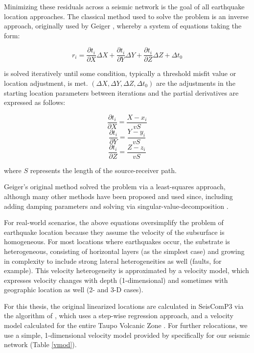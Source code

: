 Minimizing these residuals across a seismic network is the goal of all earthquake location approaches. The classical method used to solve the problem is an inverse approach, originally used by Geiger \citep{l1910,geiger1912probability}, whereby a system of equations taking the form:

\begin{equation}
r_i = \frac{\partial{t_i}}{\partial{X}}\Delta{X} + \frac{\partial{t_i}}{\partial{Y}}\Delta{Y} + \frac{\partial{t_i}}{\partial{Z}}\Delta{Z} + \Delta{t_0}\label{eq:3}
\end{equation}

is solved iteratively until some condition, typically a threshold misfit value or location adjustment, is met. $(\Delta{X}, \Delta{Y}, \Delta{Z}, \Delta{t_0})$ are the adjustments in the starting location parameters between iterations and the partial derivatives are expressed as follows:

\begin{equation}
\frac{\partial{t_i}}{\partial{X}} = \frac{X - x_i}{vS}
\end{equation}
\begin{equation}
\frac{\partial{t_i}}{\partial{Y}} = \frac{Y - y_i}{vS}
\end{equation}
\begin{equation}
\frac{\partial{t_i}}{\partial{Z}} = \frac{Z - z_i}{vS}
\end{equation}

where $S$ represents the length of the source-receiver path.

Geiger's original method solved the problem via a least-squares approach, although many other methods have been proposed and used since, including adding damping parameters and solving via singular-value-decomposition \citep{thurber1985nonlinear}.

For real-world scenarios, the above equations oversimplify the problem of earthquake location because they assume the velocity of the subsurface is homogeneous. For most locations where earthquakes occur, the substrate is heterogeneous, consisting of horizontal layers (as the simplest case) and growing in complexity to include strong lateral heterogeneities as well (faults, for example). This velocity heterogeneity is approximated by a velocity model, which expresses velocity changes with depth (1-dimensional) and sometimes with geographic location as well (2- and 3-D cases).

For this thesis, the original linearized locations are calculated in SeisComP3 via the algorithm of \citet{Lee_1972}, which uses a step-wise regression approach, and a velocity model calculated for the entire Taupo Volcanic Zone \citep{Sherburn_2003}. For further relocations, we use a simple, 1-dimensional velocity model provided by \citet{sewell2017} specifically for our seismic network (Table \ref{vmod}).

